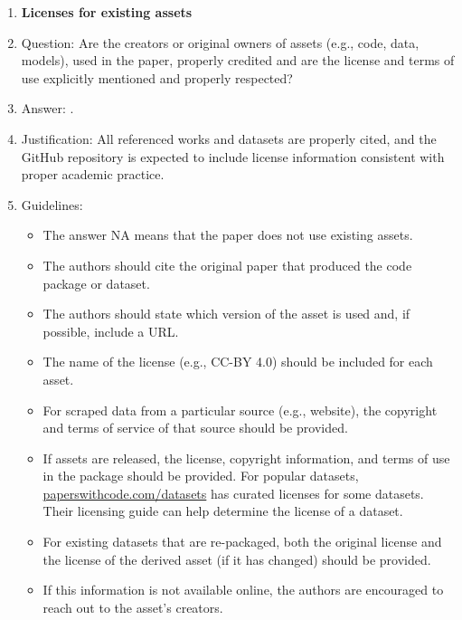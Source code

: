 \documentclass{article}
\begin{document}
\begin{enumerate}
\item {\bf Licenses for existing assets}
    \item[] Question: Are the creators or original owners of assets (e.g., code, data, models), used in the paper, properly credited and are the license and terms of use explicitly mentioned and properly respected?
    \item[] Answer: \answerYes{}.
    \item[] Justification: All referenced works and datasets are properly cited, and the GitHub repository is expected to include license information consistent with proper academic practice.
    \item[] Guidelines:
    \begin{itemize}
        \item The answer NA means that the paper does not use existing assets.
        \item The authors should cite the original paper that produced the code package or dataset.
        \item The authors should state which version of the asset is used and, if possible, include a URL.
        \item The name of the license (e.g., CC-BY 4.0) should be included for each asset.
        \item For scraped data from a particular source (e.g., website), the copyright and terms of service of that source should be provided.
        \item If assets are released, the license, copyright information, and terms of use in the package should be provided. For popular datasets, \url{paperswithcode.com/datasets} has curated licenses for some datasets. Their licensing guide can help determine the license of a dataset.
        \item For existing datasets that are re-packaged, both the original license and the license of the derived asset (if it has changed) should be provided.
        \item If this information is not available online, the authors are encouraged to reach out to the asset's creators.
    \end{itemize}


\end{enumerate}
\end{document}
